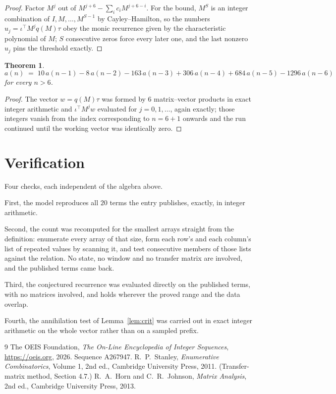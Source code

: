 \documentclass[11pt,a4paper]{article}
\theoremstyle{plain}
\newtheorem{theorem}{Theorem}
\theoremstyle{definition}
\begin{document}
\begin{proof}
Factor $M^{j}$ out of $M^{j+6}-\sum_ic_iM^{j+6-i}$. For the bound, $M^{S}$
is an integer combination of $I,M,\dots,M^{S-1}$ by Cayley--Hamilton, so the numbers
$u_j=\iota^{\!\top}M^{j}q(M)\tau$ obey the monic recurrence given by the characteristic
polynomial of $M$; $S$ consecutive zeros force every later one, and the last nonzero $u_j$
pins the threshold exactly.
\end{proof}

\begin{theorem}
\[
a(n)\;=\;10\,a(n-1) - 8\,a(n-2) - 163\,a(n-3) + 306\,a(n-4) + 684\,a(n-5) - 1296\,a(n-6)
\]
for every $n>6$.
\end{theorem}

\begin{proof}
The vector $w=q(M)\tau$ was formed by $6$ matrix--vector products in exact integer
arithmetic and $\iota^{\!\top}M^{j}w$ evaluated for $j=0,1,\dots$, again exactly; those
integers vanish from the index corresponding to $n=6+1$ onwards and the run continued
until the working vector was identically zero.
\end{proof}

\section{Verification}

Four checks, each independent of the algebra above.

First, the model reproduces all $20$ terms the entry publishes, exactly, in integer
arithmetic.

Second, the count was recomputed for the smallest arrays straight from the definition:
enumerate every array of that size, form each row's and each column's list of repeated values
by scanning it, and test consecutive members of those lists against the relation. No state, no
window and no transfer matrix are involved, and the published terms came back.

Third, the conjectured recurrence was evaluated directly on the published terms, with no
matrices involved, and holds wherever the proved range and the data overlap.

Fourth, the annihilation test of Lemma~\ref{lem:crit} was carried out in exact integer
arithmetic on the whole vector rather than on a sampled prefix.

\begin{thebibliography}{9}
 The OEIS Foundation, \emph{The On-Line Encyclopedia of Integer
Sequences}, \url{https://oeis.org}, 2026. Sequence A267947.
 R.~P.~Stanley, \emph{Enumerative Combinatorics}, Volume 1, 2nd ed.,
Cambridge University Press, 2011. (Transfer-matrix method, Section 4.7.)
 R.~A.~Horn and C.~R.~Johnson, \emph{Matrix Analysis}, 2nd ed., Cambridge
University Press, 2013.
\end{thebibliography}
\end{document}
